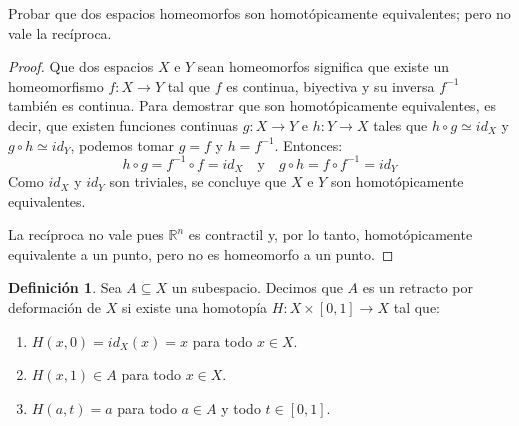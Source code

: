 \documentclass{article}
\theoremstyle{plain}
\theoremstyle{definition}
\newtheorem{definition}{Definición}[section]
\newcommand{\R}{\mathbb{R}}
\newenvironment{ejercicio}[1]{\begin{trivlist}
\item[\hskip \labelsep {\bfseries Ejercicio}\hskip \labelsep {\bfseries #1.}]}{\end{trivlist}}
\begin{document}
\vspace{0.5cm}

\begin{ejercicio}{8}
    Probar que dos espacios homeomorfos son homotópicamente equivalentes; pero no vale la recíproca.
\end{ejercicio}
\begin{proof}
    Que dos espacios \( X \) e \( Y \) sean homeomorfos significa que existe un homeomorfismo \( f : X \to Y \) tal que \( f \) es continua, biyectiva y su inversa \( f^{-1} \) también es continua.
    Para demostrar que son homotópicamente equivalentes, es decir, que existen funciones continuas \( g : X \to Y \) e \( h : Y \to X \)
    tales que \( h \circ g \simeq id_X \) y \( g \circ h \simeq id_Y \), podemos tomar \( g = f \) y \( h = f^{-1} \).
    Entonces:
    \[
        h \circ g = f^{-1} \circ f = id_X \quad \text{y} \quad g \circ h = f \circ f^{-1} = id_Y
    \]
    Como \( id_X \) y \( id_Y \) son triviales, se concluye que \( X \) e \( Y \) son homotópicamente equivalentes.

    La recíproca no vale pues \( \R^n \) es contractil y, por lo tanto, homotópicamente equivalente a un punto, pero no es homeomorfo a un punto.
\end{proof}

\vspace{0.5cm}

\begin{definition}
    Sea \( A \subseteq X \) un subespacio. Decimos que \( A \) es un retracto por deformación de \( X \) si existe una homotopía \( H : X \times [0,1] \to X \) tal que:
    \begin{enumerate}
        \item \( H(x,0) = id_X(x) = x \) para todo \( x \in X \).
        \item \( H(x,1) \in A \) para todo \( x \in X \).
        \item \( H(a,t) = a \) para todo \( a \in A \) y todo \( t \in [0,1] \).
    \end{enumerate}
\end{definition}
\end{document}

